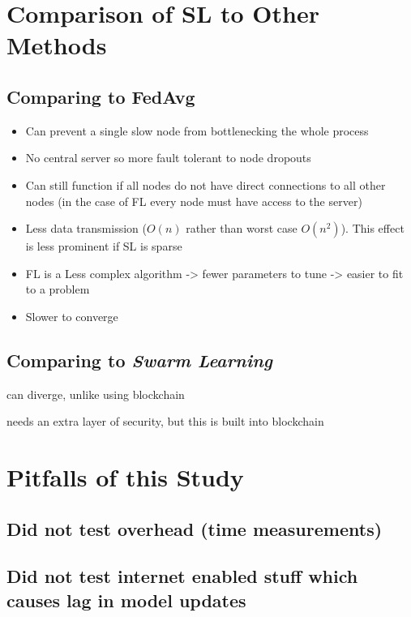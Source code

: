 \section{Comparison of SL to Other Methods}

\subsection{Comparing \SL to FedAvg}

\begin{itemize}
	\item Can prevent a single slow node from bottlenecking the whole process
	\item No central server so more fault tolerant to node dropouts
	\item Can still function if all nodes do not have direct connections to all other nodes (in the case of FL every node must have access to the server)
\end{itemize}


\begin{itemize}
	\item Less data transmission ($O(n)$ rather than worst case $O(n^2)$). This effect is less prominent if SL is sparse
	\item FL is a Less complex algorithm -> fewer parameters to tune -> easier to fit to a problem
	\item Slower to converge
\end{itemize}

\subsection{Comparing \SL to \emph{Swarm Learning}}

\SL can diverge, unlike using blockchain

\SL needs an extra layer of security, but this is built into blockchain

\section{Pitfalls of this Study}



\subsection{Did not test overhead (time measurements)}

\subsection{Did not test internet enabled stuff which causes lag in model updates}